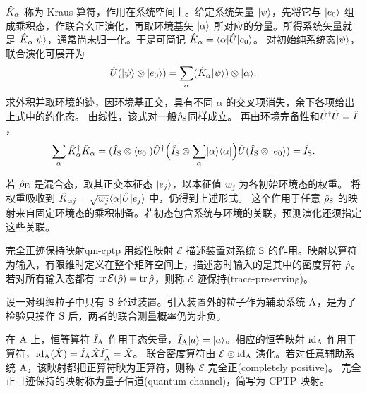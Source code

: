 $\hat{K}_\alpha$ 称为 Kraus 算符，作用在系统空间上。给定系统矢量 $\lvert\psi\rangle$，先将它与 $\lvert e_0\rangle$ 组成乘积态，作联合幺正演化，再取环境基矢 $\lvert\alpha\rangle$ 所对应的分量。所得系统矢量就是 $\hat{K}_\alpha\lvert\psi\rangle$，通常尚未归一化。于是可简记 $\hat{K}_\alpha = \langle\alpha\rvert\hat{U}\lvert e_0\rangle$。
对初始纯系统态$\lvert\psi\rangle$，联合演化可展开为
\begin{equation}
    \hat{U}(\lvert\psi\rangle \otimes \lvert e_0\rangle)
    = \sum_\alpha(\hat{K}_\alpha\lvert\psi\rangle) \otimes \lvert\alpha\rangle.
\end{equation}
求外积并取环境的迹，因环境基正交，具有不同 $\alpha$ 的交叉项消失，余下各项给出上式中的约化态。
由线性，该式对一般$\hat{\rho}_{\mathrm{S}}$同样成立。
再由环境完备性和$\hat{U}^\dagger \hat{U} = \hat{I}$，
\begin{equation}
    \sum_\alpha \hat{K}_\alpha^\dagger \hat{K}_\alpha = (\hat{I}_{\mathrm{S}} \otimes \langle e_0\rvert)
        \hat{U}^\dagger
        \Bigl(\hat{I}_{\mathrm{S}} \otimes \sum_\alpha\lvert\alpha\rangle\langle\alpha\rvert\Bigr)
        \hat{U}(\hat{I}_{\mathrm{S}} \otimes \lvert e_0\rangle) = \hat{I}_{\mathrm{S}}.
\end{equation}

若 $\hat{\rho}_{\mathrm{E}}$ 是混合态，取其正交本征态 $\lvert e_j\rangle$，以本征值 $w_j$ 为各初始环境态的权重。
将权重吸收到 $\hat{K}_{\alpha j} = \sqrt{w_j}\langle\alpha\rvert\hat{U}\lvert e_j\rangle$ 中，仍得到上述形式。
这个作用于任意 $\hat{\rho}_{\mathrm{S}}$ 的映射来自固定环境态的乘积制备。若初态包含系统与环境的关联，预测演化还须指定这些关联。

\begin{definition}{完全正迹保持映射}{qm-cptp}
    用线性映射 $\mathcal E$ 描述装置对系统 $\mathrm{S}$ 的作用。映射以算符为输入，有限维时定义在整个矩阵空间上，描述态时输入的是其中的密度算符 $\hat{\rho}$。若对所有输入态都有 $\operatorname{tr}\mathcal E(\hat{\rho}) = \operatorname{tr}\hat{\rho}$，则称 $\mathcal E$ 迹保持(trace-preserving)。

    设一对纠缠粒子中只有 $\mathrm{S}$ 经过装置。引入装置外的粒子作为辅助系统 $\mathrm{A}$，是为了检验只操作 $\mathrm{S}$ 后，两者的联合测量概率仍为非负。

    在 $\mathrm{A}$ 上，恒等算符 $\hat{I}_{\mathrm{A}}$ 作用于态矢量，$\hat{I}_{\mathrm{A}}\lvert a\rangle = \lvert a\rangle$。相应的恒等映射 $\operatorname{id}_{\mathrm{A}}$ 作用于算符，$\operatorname{id}_{\mathrm{A}}(\hat{X}) = \hat{I}_{\mathrm{A}}\hat{X}\hat{I}_{\mathrm{A}}^\dagger = \hat{X}$。
    联合密度算符由 $\mathcal E \otimes \operatorname{id}_{\mathrm{A}}$ 演化。若对任意辅助系统 $\mathrm{A}$，该映射都把正算符映为正算符，则称 $\mathcal E$ 完全正(completely positive)。
    完全正且迹保持的映射称为量子信道(quantum channel)，简写为 CPTP 映射。
\end{definition}

